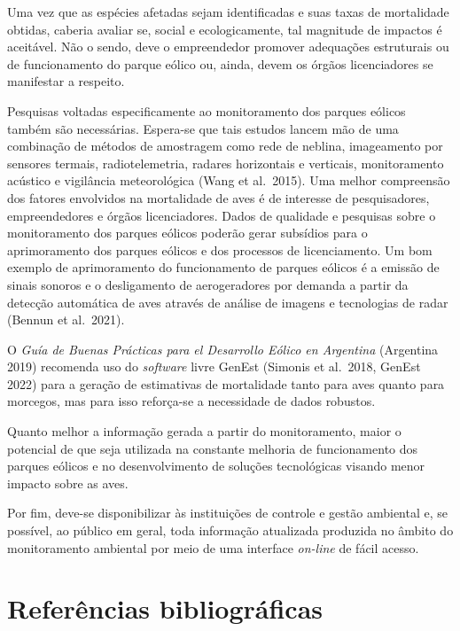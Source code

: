 \documentclass[
  oneside]{scrbook}
\begin{document}
Uma vez que as espécies afetadas sejam identificadas e suas taxas de mortalidade obtidas, caberia avaliar se, social e ecologicamente, tal magnitude de impactos é aceitável. Não o sendo, deve o empreendedor promover adequações estruturais ou de funcionamento do parque eólico ou, ainda, devem os órgãos licenciadores se manifestar a respeito.

Pesquisas voltadas especificamente ao monitoramento dos parques eólicos também são necessárias. Espera-se que tais estudos lancem mão de uma combinação de métodos de amostragem como rede de neblina, imageamento por sensores termais, radiotelemetria, radares horizontais e verticais, monitoramento acústico e vigilância meteorológica (Wang et al.~2015). Uma melhor compreensão dos fatores envolvidos na mortalidade de aves é de interesse de pesquisadores, empreendedores e órgãos licenciadores. Dados de qualidade e pesquisas sobre o monitoramento dos parques eólicos poderão gerar subsídios para o aprimoramento dos parques eólicos e dos processos de licenciamento. Um bom exemplo de aprimoramento do funcionamento de parques eólicos é a emissão de sinais sonoros e o desligamento de aerogeradores por demanda a partir da detecção automática de aves através de análise de imagens e tecnologias de radar (Bennun et al.~2021).

O \emph{Guía de Buenas Prácticas para el Desarrollo Eólico en Argentina} (Argentina 2019) recomenda uso do \emph{software} livre GenEst (Simonis et al.~2018, GenEst 2022) para a geração de estimativas de mortalidade tanto para aves quanto para morcegos, mas para isso reforça-se a necessidade de dados robustos.

Quanto melhor a informação gerada a partir do monitoramento, maior o potencial de que seja utilizada na constante melhoria de funcionamento dos parques eólicos e no desenvolvimento de soluções tecnológicas visando menor impacto sobre as aves.

Por fim, deve-se disponibilizar às instituições de controle e gestão ambiental e, se possível, ao público em geral, toda informação atualizada produzida no âmbito do monitoramento ambiental por meio de uma interface \emph{on-line} de fácil acesso.

\hypertarget{referuxeancias-bibliogruxe1ficas-5}{%
\section{Referências bibliográficas}\label{referuxeancias-bibliogruxe1ficas-5}}
\end{document}
